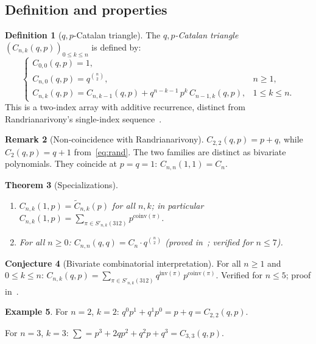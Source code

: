 \documentclass[12pt,a4paper,reqno]{amsart}
\theoremstyle{plain}
\newtheorem{theorem}{Theorem}[section]
\theoremstyle{definition}
\newtheorem{definition}[theorem]{Definition}
\newtheorem{example}[theorem]{Example}
\newtheorem{remark}[theorem]{Remark}
\newtheorem{conjecture}[theorem]{Conjecture}
\newcommand{\Inv}{\mathrm{inv}}
\newcommand{\Coinv}{\mathrm{coinv}}
\newcommand{\Snkp}[1]{S'_{n,k}(#1)}
\newcommand{\Ctilde}{\widetilde{C}}
\begin{document}
\subsection{Definition and properties}
\begin{definition}[$q{,}p$-Catalan triangle]\label{def:qptriangle}
The \emph{$q{,}p$-Catalan triangle} $(C_{n,k}(q,p))_{0\le k\le n}$ is defined by:
\begin{equation}\label{eq:qprec}
\begin{cases}
C_{0,0}(q,p)=1,\\[4pt]
C_{n,0}(q,p)=q^{\binom{n}{2}}, & n\ge1,\\[4pt]
C_{n,k}(q,p)=C_{n,k-1}(q,p)+q^{n-k-1}\,p^k\,C_{n-1,k}(q,p), & 1\le k\le n.
\end{cases}
\end{equation}
This is a two-index array with additive recurrence,
distinct from Randrianarivony's single-index sequence~\cite{Rand}.
\end{definition}

\begin{remark}[Non-coincidence with Randrianarivony]\label{rem:rand}
$C_{2,2}(q,p)=p+q$, while $C_2(q,p)=q+1$ from~\eqref{eq:rand}.
The two families are distinct as bivariate polynomials.
They coincide at $p=q=1$: $C_{n,n}(1,1)=C_n$.
\end{remark}

\begin{theorem}[Specializations]\label{thm:qp}
\begin{enumerate}
\item[\rm(i)] $C_{n,k}(1,p)=\Ctilde_{n,k}(p)$ for all $n,k$;
in particular $C_{n,k}(1,p)=\sum_{\pi\in\Snkp{312}}p^{\Coinv(\pi)}$.
\item[\rm(ii)] For all $n\ge0$:
$C_{n,n}(q,q)=C_n\cdot q^{\binom{n}{2}}$
(proved in~\cite{W5}; verified for $n\le7$).
\end{enumerate}
\end{theorem}

\begin{conjecture}[Bivariate combinatorial interpretation]\label{conj:qp}
For all $n\ge1$ and $0\le k\le n$:
$C_{n,k}(q,p)=\sum_{\pi\in\Snkp{312}}q^{\Inv(\pi)}\,p^{\Coinv(\pi)}$.
Verified for $n\le5$; proof in~\cite{W5}.
\end{conjecture}

\begin{example}\label{ex:qp_n2}
For $n=2$, $k=2$: $q^0p^1+q^1p^0=p+q=C_{2,2}(q,p)$.\checkmark

For $n=3$, $k=3$:
$\sum=p^3+2qp^2+q^2p+q^3=C_{3,3}(q,p)$.\checkmark
\end{example}
\end{document}

